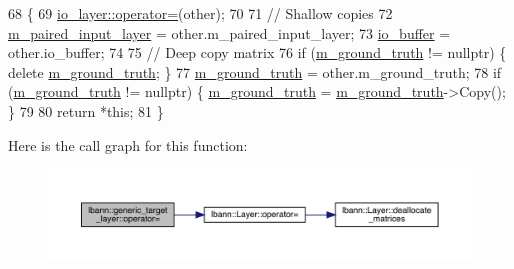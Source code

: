 \begin{DoxyCode}
68                                                                      \{
69     \hyperlink{classlbann_1_1Layer_a00d8acde68fda2f38c4a39ef8c89234a}{io\_layer::operator=}(other);
70 
71     \textcolor{comment}{// Shallow copies}
72     \hyperlink{classlbann_1_1generic__target__layer_a84da1260e9feb4fbc3e6f2315e4cab4b}{m\_paired\_input\_layer} = other.m\_paired\_input\_layer;
73     \hyperlink{classlbann_1_1generic__target__layer_a8da650b94f50cc63fc90cd792fa50c3f}{io\_buffer} = other.io\_buffer; 
74     
75     \textcolor{comment}{// Deep copy matrix}
76     \textcolor{keywordflow}{if} (\hyperlink{classlbann_1_1generic__target__layer_acb9ba351caf22b8e2378e4cd1e256da7}{m\_ground\_truth} != \textcolor{keyword}{nullptr}) \{ \textcolor{keyword}{delete} \hyperlink{classlbann_1_1generic__target__layer_acb9ba351caf22b8e2378e4cd1e256da7}{m\_ground\_truth}; \}
77     \hyperlink{classlbann_1_1generic__target__layer_acb9ba351caf22b8e2378e4cd1e256da7}{m\_ground\_truth} = other.m\_ground\_truth;
78     \textcolor{keywordflow}{if} (\hyperlink{classlbann_1_1generic__target__layer_acb9ba351caf22b8e2378e4cd1e256da7}{m\_ground\_truth} != \textcolor{keyword}{nullptr}) \{ \hyperlink{classlbann_1_1generic__target__layer_acb9ba351caf22b8e2378e4cd1e256da7}{m\_ground\_truth} = 
      \hyperlink{classlbann_1_1generic__target__layer_acb9ba351caf22b8e2378e4cd1e256da7}{m\_ground\_truth}->Copy(); \}
79 
80     \textcolor{keywordflow}{return} *\textcolor{keyword}{this};
81   \}
\end{DoxyCode}
Here is the call graph for this function\+:\nopagebreak
\begin{figure}[H]
\begin{center}
\leavevmode
\includegraphics[width=350pt]{classlbann_1_1generic__target__layer_a7c15e3fe4f1fd7f0ccdbc4c3ed8c793e_cgraph}
\end{center}
\end{figure}
\mbox{\label{classlbann_1_1generic__target__layer_a10a0cd1cc77c97e62f14a77ff380559a}} 
